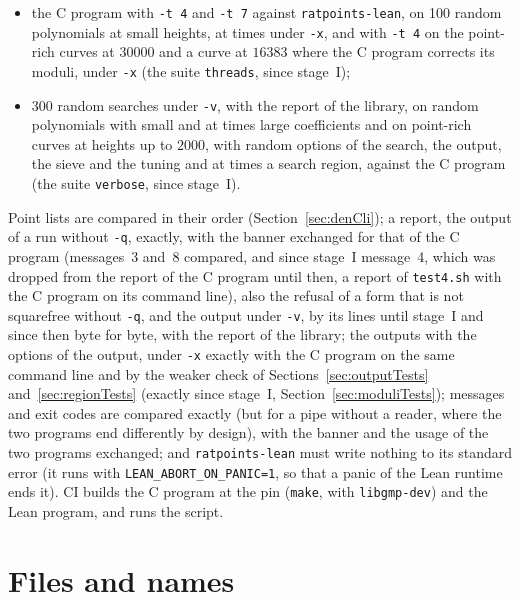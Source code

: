 \begin{itemize}
    them infinities, zeros, the least subnormal and huge values, at times with the cut points and
    the numbers of primes given, at heights up to $3000$, with \verb|-q| or the report and at times
    under \verb|-x|, against the C program (the suite \verb|tuning|, since stage~I);
  \item the C program with \verb|-t 4| and \verb|-t 7| against \verb|ratpoints-lean|, on 100
    random polynomials at small heights, at times under \verb|-x|, and with \verb|-t 4| on the
    point-rich curves at $30000$ and a curve at $16383$ where the C program corrects its moduli,
    under \verb|-x| (the suite \verb|threads|, since stage~I);
  \item 300 random searches under \verb|-v|, with the report of the library, on random polynomials
    with small and at times large coefficients and on point-rich curves at heights up to $2000$,
    with random options of the search, the output, the sieve and the tuning and at times a search
    region, against the C program (the suite \verb|verbose|, since stage~I).
\end{itemize}
Point lists are compared in their order (Section~\ref{sec:denCli}); a report, the output of a run
without \verb|-q|, exactly, with the banner exchanged for that of the C program (messages~3 and~8
compared, and since stage~I message~4, which was dropped from the report of the C program until
then, a report of \verb|test4.sh| with the C program on its command line), also the refusal of a
form that is not squarefree without \verb|-q|, and the output under \verb|-v|, by its lines until
stage~I and since then byte for byte, with the report of the library; the outputs with the options
of the output, under \verb|-x| exactly with the C program on the same command line and by the weaker
check of Sections~\ref{sec:outputTests} and~\ref{sec:regionTests} (exactly since stage~I,
Section~\ref{sec:moduliTests}); messages and exit codes are compared exactly (but for a pipe without
a reader, where the two programs end differently by design), with the banner and the usage of the
two programs exchanged; and \verb|ratpoints-lean| must write nothing to its standard error (it runs
with \verb|LEAN_ABORT_ON_PANIC=1|, so that a panic of the Lean runtime ends it). CI builds the C
program at the pin (\verb|make|, with \verb|libgmp-dev|) and the Lean program, and runs the script.

\section{Files and names}

